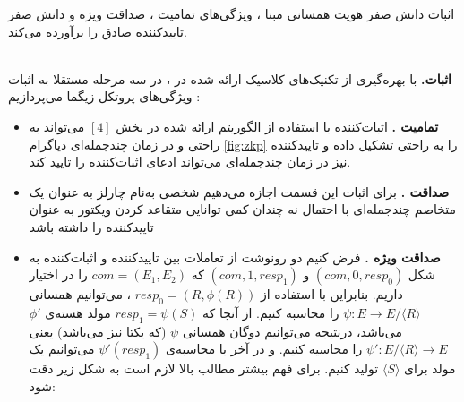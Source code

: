 \begin{theorem}\label{thm:zkp}
اثبات دانش صفر هویت همسانی مبنا ، ویژگی‌های تمامیت ، صداقت ویژه و دانش صفر تاییدکننده صادق را برآورده می‌کند.
\end{theorem}~
\\
\textbf{ اثبات.}
با بهره‌گیری از تکنیک‌های کلاسیک ارائه شده در
\cite{feige1988zero , goldreich1991proofs}
، در سه مرحله مستقلا ‌به اثبات ویژگی‌های پروتکل زیگما می‌پردازیم :  
\begin{itemize}
	
\item[]{
\textbf{تمامیت . }
اثبات‌کننده با استفاده از الگوریتم ارائه شده  در بخش
$[4]$
می‌تواند به راحتی و در زمان چندجمله‌ای دیاگرام 
\ref{fig:zkp}
را به راحتی تشکیل داده و تاییدکننده نیز در زمان چندجمله‌ای می‌تواند ادعای اثبات‌کننده را تایید کند.
}

\item [] {
\textbf{صداقت .}
برای اثبات این قسمت اجازه می‌دهیم شخصی به‌نام چارلز به عنوان یک متخاصم چندجمله‌ای با احتمال نه چندان کمی‌ توانایی متقاعد کردن ویکتور به عنوان تاییدکننده را داشته باشد
}

\item[] {
\textbf{صداقت ویژه .}
فرض کنیم دو رونوشت از تعاملات بین تاییدکننده و اثبات‌کننده به شکل
$(com,0,resp_0)$
و
$(com,1,resp_1)$
که 
$com = (E_1,E_2)$
را در اختیار داریم. بنابراین با استفاده از
$resp_0 = (R,\phi(R))$
، می‌توانیم همسانی
$\psi : E \rightarrow E / \langle R \rangle $
را محاسبه کنیم. از آنجا که 
$resp_1 = \psi(S)$
مولد هسته‌ی
${\phi} '$
می‌باشد، درنتیجه می‌توانیم دوگان همسانی
$\psi$
(که یکتا نیز می‌باشد) یعنی
${\psi}' : E / \langle R \rangle \rightarrow E $
را محاسیه کنیم. و در آخر با محاسبه‌ی
${\psi}'(resp_1)$
می‌توانیم یک مولد برای
$\langle S \rangle $
تولید کنیم. برای فهم بیشتر مطالب بالا لازم است به شکل زیر دقت شود:


\begin{figure}[H] 
	\begin{center}
		
		

\end{center}
\end{figure}}
\end{itemize}
